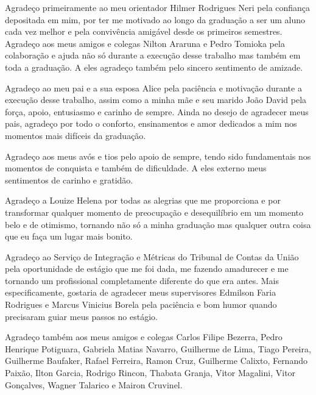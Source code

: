 \begin{agradecimentos}

Agradeço primeiramente ao meu orientador Hilmer Rodrigues Neri pela confiança depositada em mim, por ter me motivado ao longo da graduação a ser um aluno cada vez melhor e pela convivência amigável desde os primeiros semestres. Agradeço aos meus amigos e colegas Nilton Araruna e Pedro Tomioka pela colaboração e ajuda não só durante a execução desse trabalho mas também em toda a graduação. A eles agradeço também pelo sincero sentimento de amizade.

Agradeço ao meu pai e a sua esposa Alice pela paciência e motivação durante a execução desse trabalho, assim como a minha mãe e seu marido João David pela força, apoio, entusiasmo e carinho de sempre. Ainda no desejo de agradecer meus pais, agradeço por todo o conforto, ensinamentos e amor dedicados a mim nos momentos mais difíceis da graduação.

Agradeço aos meus avós e tios pelo apoio de sempre, tendo sido fundamentais nos momentos de conquista e também de dificuldade. A eles externo meus sentimentos de carinho e gratidão.

Agradeço a Louize Helena por todas as alegrias que me proporciona e por transformar qualquer momento de preocupação e desequilíbrio em um momento belo e de otimismo, tornando não só a minha graduação mas qualquer outra coisa que eu faça um lugar mais bonito. 

Agradeço ao Serviço de Integração e Métricas do Tribunal de Contas da União pela oportunidade de estágio que me foi dada, me fazendo amadurecer e me tornando um profissional completamente diferente do que era antes. Mais especificamente, gostaria de agradecer meus supervisores Edmilson Faria Rodrigues e Marcus Vinicius Borela pela paciência e bom humor quando precisaram guiar meus passos no estágio.

Agradeço também aos meus amigos e colegas Carlos Filipe Bezerra, Pedro Henrique Potiguara, Gabriela Matias Navarro, Guilherme de Lima, Tiago Pereira, Guilherme Baufaker, Rafael Ferreira, Ramon Cruz, Guilherme Calixto, Fernando Paixão, Ilton Garcia, Rodrigo Rincon, Thabata Granja, Vitor Magalini, Vitor Gonçalves, Wagner Talarico e Mairon Cruvinel. 


\end{agradecimentos}
